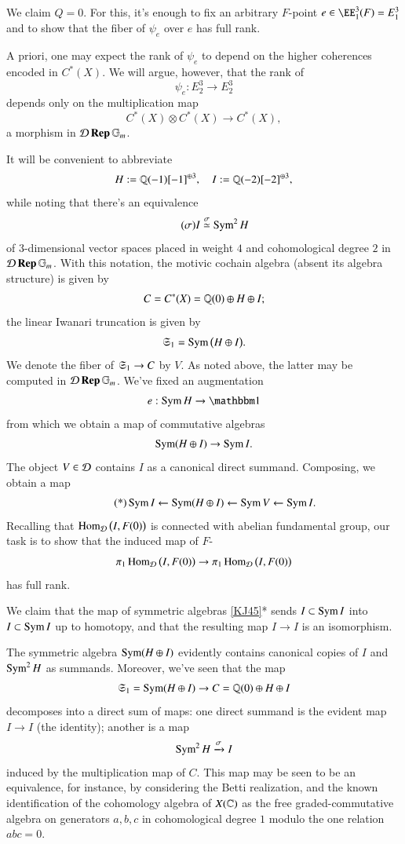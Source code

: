 \sspar{}
\label{KJ44}
We claim $Q = 0$. For this, it's enough to fix an arbitrary $F$-point $e \in \EE_1^3(F) = E_1^3$ and to show that the fiber of $\psi_e$ over $e$ has full rank.


\begin{ssRemark}
A priori, one may expect the rank of $\psi_e$ to depend on the higher coherences encoded in $C^*(X)$. We will argue, however, that the rank of 
\[
\psi_e : E_2^3 \to E_2^3
\]
depends only on the multiplication map
\[
C^*(X) \otimes C^*(X) \to C^*(X),
\]
a morphism in $\mathcal{D} \operatorname{\bf{Rep}} {\mathbb{G}_m}$. 
\end{ssRemark}

\sspar{}
\label{KJ45}
It will be convenient to abbreviate
\[
H := \mathbb{Q}(-1)[-1]^{\oplus 3}, \quad 
I := \mathbb{Q}(-2)[-2]^{\oplus 3},
\]
while noting that there's an equivalence
\[
\tag{$\sigma$}
I \overset {\sigma} \simeq \operatorname{Sym}^2 H
\]
of 3-dimensional vector spaces placed in weight $4$ and cohomological degree $2$ in $\mathcal{D} \operatorname{\bf{Rep}} {\mathbb{G}_m}$. With this notation, the motivic cochain algebra (absent its algebra structure) is given by
\[
C = C^*(X) = \mathbb{Q}(0) \oplus H \oplus I;
\]
the linear Iwanari truncation is given by
\[
\mathfrak{S}_1 = \operatorname{Sym} \big( H \oplus I \big).
\]
We denote the fiber of $\mathfrak{S}_1 \to C$ by $V$. As noted above, the latter may be computed in $\mathcal{D} \operatorname{\bf{Rep}} {\mathbb{G}_m}$. We've fixed an augmentation 
\[
e: \Sym H \to \one
\]
from which we obtain a map of commutative algebras
\[
\operatorname{Sym}(H \oplus I) \to \operatorname{Sym} I.
\]
The object $V \in \mathcal{D}$ contains $I$ as a canonical direct summand. Composing, we obtain a map
\[
\tag{*}
\operatorname{Sym} I \leftarrow \operatorname{Sym} (H \oplus I) \leftarrow \operatorname{Sym} V \leftarrow \operatorname{Sym} I. 
\]
Recalling that $\operatorname{Hom}_{\mathcal{D}} \big( I , F(0) \big)$ is connected with abelian fundamental group, our task is to show that the induced map of $F$-\vectorspaces
\[
\pi_1 \operatorname{Hom}_{\mathcal{D}} \big( I , F(0) \big)
\to
\pi_1 \operatorname{Hom}_{\mathcal{D}} \big( I , F(0) \big)
\] 
has full rank. 

\sspar{}
\label{KJ47}
We claim that 
the map of symmetric algebras \ref{KJ45}* sends $I \subset \operatorname{Sym} I$ into $I \subset \operatorname{Sym} I$ up to homotopy, and that the resulting map $I \to I$ is an isomorphism. 

\sspar{}
\label{KJ48}
The symmetric algebra $\operatorname{Sym} (H \oplus I)$ evidently contains canonical copies of $I$ and $\operatorname{Sym}^2 H$ as summands. Moreover, we've seen that the map
\[
\mathfrak{S}_1 = \operatorname{Sym}(H \oplus I) \to C = \mathbb{Q}(0) \oplus H \oplus I
\]
decomposes into a direct sum of maps: one direct summand is the evident map $I \to I$ (the identity); another is a map 
\[
 \operatorname{Sym}^2 H \xrightarrow{\sigma} I
\]
induced by the multiplication map of $C$. This map may be seen to be an equivalence, for instance, by considering the Betti realization, and the known identification of the cohomology algebra of $X(\mathbb{C})$ as the free graded-commutative algebra on generators $a,b,c$ in cohomological degree $1$ modulo the one relation $abc = 0$. 

